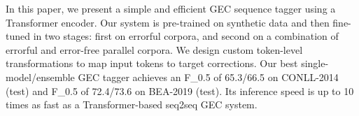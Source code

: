 In this paper, we present a simple and efficient GEC sequence tagger using a Transformer encoder. Our system is pre-trained on synthetic data and then fine-tuned in two stages: first on errorful corpora, and second on a combination of errorful and error-free parallel corpora. We design custom token-level transformations to map input tokens to target corrections. Our best single-model/ensemble GEC tagger achieves an F\_0.5 of 65.3/66.5 on CONLL-2014 (test) and F\_0.5 of 72.4/73.6 on BEA-2019 (test). Its inference speed is up to 10 times as fast as a Transformer-based seq2seq GEC system.
